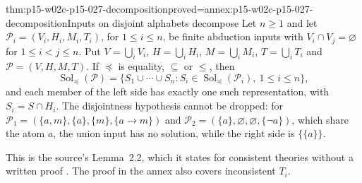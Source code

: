 \begin{hblemma}{thm:p15-w02c-p15-027-decomposition}{proved=annex:p15-w02c-p15-027-decomposition}{Inputs on disjoint alphabets decompose}
Let \(n\ge 1\) and let \(\mathcal P_i=(V_i,H_i,M_i,T_i)\), for
\(1\le i\le n\), be finite abduction inputs with
\(V_i\cap V_j=\varnothing\) for \(1\le i<j\le n\). Put
\(V=\bigcup_iV_i\), \(H=\bigcup_iH_i\), \(M=\bigcup_iM_i\),
\(T=\bigcup_iT_i\) and \(\mathcal P=(V,H,M,T)\). If \(\preceq\) is
equality, \(\subseteq\) or \(\le\), then
\[
 \operatorname{Sol}_{\preceq}(\mathcal P)
  =\{S_1\cup\cdots\cup S_n:
       S_i\in\operatorname{Sol}_{\preceq}(\mathcal P_i),\ 1\le i\le n\},
\]
and each member of the left side has exactly one such representation,
with \(S_i=S\cap H_i\). The disjointness hypothesis cannot be dropped:
for \(\mathcal P_1=(\{a,m\},\{a\},\{m\},\{a\to m\})\) and
\(\mathcal P_2=(\{a\},\varnothing,\varnothing,\{\neg a\})\), which share
the atom \(a\), the union input has no solution, while the right side is
\(\{\{a\}\}\).
\end{hblemma}

This is the source's Lemma~2.2, which it states for consistent theories
without a written proof
\cite[lem.~2.2, manuscript p.~11]{EiterGottlobAbductionManuscript}. The
proof in the annex also covers inconsistent \(T_i\).

